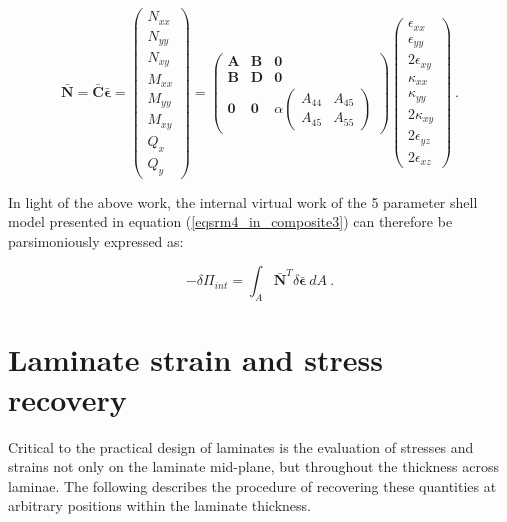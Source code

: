 \begin{equation} 
\bar{\mathbf{N}} = \bar{\mathbf{C}} \bar{\boldsymbol{\epsilon}} =
\begin{pmatrix}
N_{xx} \\
N_{yy} \\
N_{xy} \\
M_{xx} \\
M_{yy} \\
M_{xy} \\
Q_{x} \\
Q_{y} 
\end{pmatrix} 
=
\begin{pmatrix}
\mathbf{A} & \mathbf{B} & \mathbf{0} \\
\mathbf{B} & \mathbf{D} & \mathbf{0} \\
\mathbf{0}& \mathbf{0} & \alpha		\begin{pmatrix}
								{A}_{44} & {A}_{45} \\
 								{A}_{45} & {A}_{55} 
 								\end{pmatrix} 
\end{pmatrix} 
\begin{pmatrix}
\epsilon_{xx} \\
\epsilon_{yy} \\
2\epsilon_{xy}\\
\kappa_{xx}\\
\kappa_{yy}\\
2\kappa_{xy} \\
2\epsilon_{yz} \\
2\epsilon_{xz}
\end{pmatrix}
\label{eqscomp_laminate_constitutive7}\ .
\end{equation}

In light of the above work, the internal virtual work of the 5 parameter shell model presented in equation (\ref{eqsrm4_in_composite3}) can therefore be parsimoniously expressed as:

\begin{equation} 
-\delta\Pi_{int} =
\int_A
\bar{\mathbf{N}}^T
\delta \bar{\boldsymbol{\epsilon}}
\ dA
\label{eqscomp_laminate_constitutive8}\ .
\end{equation}

\section{Laminate strain and stress recovery}
\label{Laminate strain and stress recovery}

Critical to the practical design of laminates is the evaluation of stresses and strains not only on the laminate mid-plane, but throughout the thickness across laminae. The following describes the procedure of recovering these quantities at arbitrary positions within the laminate thickness.

